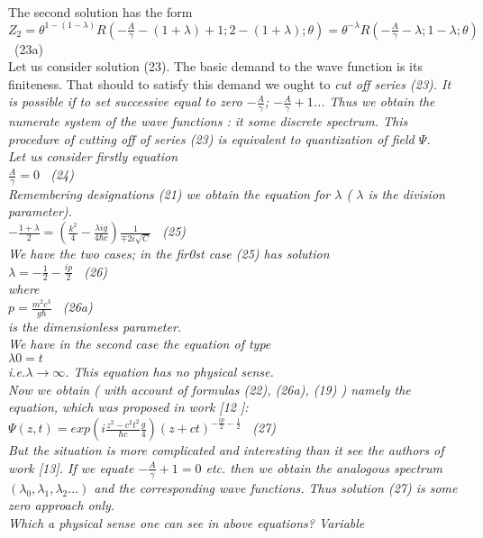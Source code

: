 \documentclass[a4paper,12pt] {article}
\begin{document}
\\The second   solution has the form {\\$ Z_2 = \theta ^{1-(1-\lambda )} R (-\frac {A}{\gamma}- (1+\lambda)+1; 2-(1+\lambda) ; \theta ) =\theta ^{-\lambda} R (-\frac {A}{\gamma}-\lambda ; 1-\lambda ;\theta ) $ \ (23a)
\\ Let us consider solution (23). The basic demand to the  wave function is its finiteness. That should to
  satisfy this demand we ought to \it cut off  \rm series  (23). It is possible if  \it to set successive equal to
 zero
 $ - \frac {A}{\gamma}$; $  - \frac {A}{\gamma}+1$... \rm Thus we obtain the numerate system of the
wave functions : it  some discrete spectrum. \rm This procedure of cutting off of series (23) is equivalent
 to  \it quantization of field $\Psi$.
\\  \rm Let us consider firstly equation \\$  \frac {A}{\gamma}=0 $ \ (24) \\ Remembering designations
(21) we  obtain the equation for $\lambda$ ( $\lambda$ is the division parameter).
\\$ -\frac {1+\lambda}{2}=(\frac {k^2}{4}- \frac {\lambda i g}{4\hbar c })\frac {1}{\mp 2i\sqrt C}$ \ (25)
\\ We have the two cases; in the fir0st case  (25) has  solution
\\$ \lambda = -\frac {1}{2}- \frac {ip}{2}$ \ (26)\\ where \\$ p=\frac {m^2 c^3}{g\hbar} $ \ (26a)
\\ is the dimensionless parameter.\\ We have in the second case the equation of type
\\$\lambda  0 =t$\\i.e.$ \lambda \to \infty $. This equation has no physical sense.\\ Now we obtain ( with
 account of formulas (22), (26a), (19) )  \it namely the equation, which was proposed in work \rm [12
]:\\$ \Psi (z,t) = exp (i \frac {z^2-c^2t^2}{\hbar c} \frac{g}{4}) (z+ct)^{-\frac {ip}{2}- \frac {1}{2} }$ \ (27)\\ But the situation is more complicated and
interesting  than it see the authors of work  [13]. If we equate
$ -\frac{A}{ \gamma} +1=0$ etc. then we obtain the analogous spectrum
 $ (\lambda_0, \lambda_1,\lambda_2 ...)$ and the corresponding wave functions. Thus solution (27) is
 some \it  zero approach only.\\ \rm Which a  physical sense one can see in above equations? Variable
}
\end{document}
